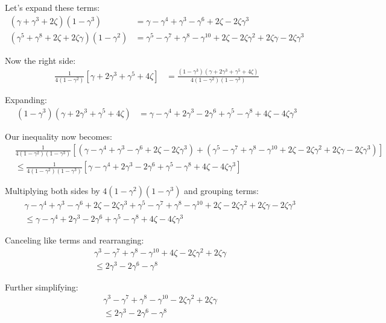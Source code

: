 Let's expand these terms:
\begin{align}
(\gamma + \gamma^3 + 2\zeta)(1-\gamma^3) &= \gamma - \gamma^4 + \gamma^3 - \gamma^6 + 2\zeta - 2\zeta\gamma^3 \\
(\gamma^5 + \gamma^8 + 2\zeta + 2\zeta\gamma)(1-\gamma^2) &= \gamma^5 - \gamma^7 + \gamma^8 - \gamma^{10} + 2\zeta - 2\zeta\gamma^2 + 2\zeta\gamma - 2\zeta\gamma^3
\end{align}

Now the right side:
\begin{align}
\frac{1}{4(1-\gamma^2)} \left[\gamma + 2\gamma^3 + \gamma^5 + 4\zeta\right] &= \frac{(1-\gamma^3)(\gamma + 2\gamma^3 + \gamma^5 + 4\zeta)}{4(1-\gamma^2)(1-\gamma^3)}
\end{align}

Expanding:
\begin{align}
(1-\gamma^3)(\gamma + 2\gamma^3 + \gamma^5 + 4\zeta) &= \gamma - \gamma^4 + 2\gamma^3 - 2\gamma^6 + \gamma^5 - \gamma^8 + 4\zeta - 4\zeta\gamma^3
\end{align}

Our inequality now becomes:
\begin{align}
&\frac{1}{4(1-\gamma^2)(1-\gamma^3)}\left[(\gamma - \gamma^4 + \gamma^3 - \gamma^6 + 2\zeta - 2\zeta\gamma^3) + (\gamma^5 - \gamma^7 + \gamma^8 - \gamma^{10} + 2\zeta - 2\zeta\gamma^2 + 2\zeta\gamma - 2\zeta\gamma^3)\right] \\
&\leq \frac{1}{4(1-\gamma^2)(1-\gamma^3)}\left[\gamma - \gamma^4 + 2\gamma^3 - 2\gamma^6 + \gamma^5 - \gamma^8 + 4\zeta - 4\zeta\gamma^3\right]
\end{align}

Multiplying both sides by $4(1-\gamma^2)(1-\gamma^3)$ and grouping terms:
\begin{align}
&\gamma - \gamma^4 + \gamma^3 - \gamma^6 + 2\zeta - 2\zeta\gamma^3 + \gamma^5 - \gamma^7 + \gamma^8 - \gamma^{10} + 2\zeta - 2\zeta\gamma^2 + 2\zeta\gamma - 2\zeta\gamma^3 \\
&\leq \gamma - \gamma^4 + 2\gamma^3 - 2\gamma^6 + \gamma^5 - \gamma^8 + 4\zeta - 4\zeta\gamma^3
\end{align}

Canceling like terms and rearranging:
\begin{align}
&\gamma^3 - \gamma^7 + \gamma^8 - \gamma^{10} + 4\zeta - 2\zeta\gamma^2 + 2\zeta\gamma \\
&\leq 2\gamma^3 - 2\gamma^6 - \gamma^8
\end{align}

Further simplifying:
\begin{align}
&\gamma^3 - \gamma^7 + \gamma^8 - \gamma^{10} - 2\zeta\gamma^2 + 2\zeta\gamma \\
&\leq 2\gamma^3 - 2\gamma^6 - \gamma^8
\end{align}

